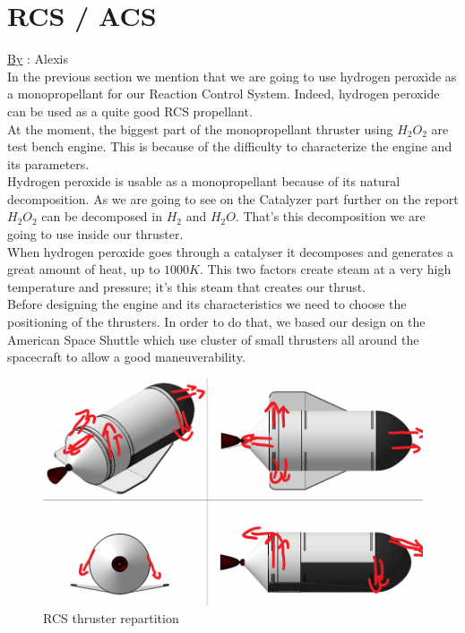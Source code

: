 \section{RCS / ACS}
\qquad \underline{By} : Alexis\\

In the previous section we mention that we are going to use hydrogen peroxide as a monopropellant for our Reaction Control System. Indeed, hydrogen peroxide can be used as a quite good RCS propellant. \\

At the moment, the biggest part of the monopropellant thruster using $H_2O_2$ are test bench engine. This is because of the difficulty to characterize the engine and its parameters. \\

Hydrogen peroxide is usable as a monopropellant because of its natural decomposition. As we are going to see on the Catalyzer part further on the report $H_2O_2$ can be decomposed in $H_2$ and $H_2O$. That's this decomposition we are going to use inside our thruster. \\
When hydrogen peroxide goes through a catalyser it decomposes and generates a great amount of heat, up to $1000K$. This two factors create steam at a very high temperature and pressure; it's this steam that creates our thrust.\\

Before designing the engine and its characteristics we need to choose the positioning of the thrusters. In order to do that, we based our design on the American Space Shuttle which use cluster of small thrusters all around the spacecraft to allow a good maneuverability.  

\begin{figure}[H]
    \centering
    \includegraphics[width=\linewidth]{shiprcs}
    \caption{RCS thruster repartition}
\end{figure}

